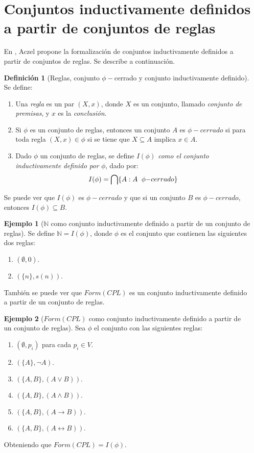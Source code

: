 \documentclass[11pt,oneside]{report}
\theoremstyle{plain}
\theoremstyle{definition}
\newtheorem{defi}{Definición}[chapter]
\newtheorem{ejemplo}{Ejemplo}[chapter]
\newcommand{\N}{\mathbb{N}}
\begin{document}
\section{Conjuntos inductivamente definidos a partir de conjuntos de reglas}

En \cite{Aczel}, Aczel propone la formalización de conjuntos inductivamente definidos a partir de conjuntos de reglas. Se describe a continuación.

\begin{defi}[Reglas, conjunto $\phi-$cerrado y conjunto inductivamente definido]
    Se define:
    \begin{enumerate}
        \item Una \emph{regla} es un par $(X,x)$, donde $X$ es un conjunto, llamado \emph{conjunto de premisas}, y $x$ es la \emph{conclusión}.
        \item Si $\phi$ es un conjunto de reglas, entonces un conjunto $A$ es \emph{$\phi - cerrado$} si para toda regla $(X,x) \in \phi$ si se tiene que $X \subseteq A$ implica $x \in A$.
        \item Dado $\phi$ un conjunto de reglas, se define \emph{$I(\phi)$ como el conjunto inductivamente definido por $\phi$}, dado por:
              $$I(\phi) = \bigcap \{A : A \hspace{2mm}\phi{-cerrado}\}$$
    \end{enumerate}
\end{defi}
Se puede ver que $I(\phi)$ es $\phi -cerrado$ y que si un conjunto $B$ es $\phi -cerrado$, entonces $I(\phi) \subseteq B$.
\begin{ejemplo}[$\N$ como conjunto inductivamente definido a partir de un conjunto de reglas]
    Se define $\N = I(\phi)$, donde $\phi$ es el conjunto que contienen las siguientes dos reglas:
    \begin{enumerate}
        \item $(\emptyset,0)$.
        \item $(\{n\},s(n))$.
    \end{enumerate}
\end{ejemplo}

También se puede ver que $Form(CPL)$ es un conjunto inductivamente definido a partir de un conjunto de reglas.
\begin{ejemplo}[$Form(CPL)$ como conjunto inductivamente definido a partir de un conjunto de reglas]
    Sea $\phi$ el conjunto con las siguientes reglas:
    \begin{enumerate}
        \item $(\emptyset, p_i)$ para cada $p_i \in V$.
        \item $(\{A\}, \neg A)$.
        \item $(\{A, B\}, (A \lor B))$.
        \item $(\{A, B\}, (A \land B))$.
        \item $(\{A, B\}, (A \rightarrow B))$.
        \item $(\{A, B\}, (A \leftrightarrow B))$.
    \end{enumerate}
    Obteniendo que $Form(CPL) = I(\phi)$.
\end{ejemplo}
\end{document}
